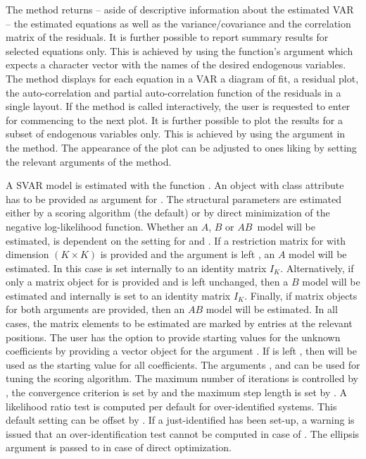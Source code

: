 \documentclass[nojss]{jss}
\begin{document}
The  method returns -- aside of descriptive information about
the estimated VAR -- the estimated equations as well as the
variance/covariance and the correlation matrix of the residuals. It is
further possible to report summary results for selected equations
only. This is achieved by using the function's argument 
which expects a character vector with the names of the desired
endogenous variables. The  method displays for each
equation in a VAR a diagram of fit, a residual plot, the auto-correlation and
partial auto-correlation function of the residuals in a single layout. If the
 method is called interactively, the user is requested to
enter  for commencing to the next plot. It is further
possible to plot the results for a subset of endogenous variables
only. This is achieved by using the argument  in the
 method. The appearance of the plot can be adjusted to ones
liking by setting the relevant arguments of the  method.

A SVAR model is estimated with the function . An object
with class attribute  has to be provided as argument for
. The structural parameters are estimated either by a scoring
algorithm (the default) or by direct minimization of the negative
log-likelihood function. Whether an $A$, $B$ or $AB$~model will be
estimated, is dependent on the setting for  and
. If a restriction matrix for  with dimension
$(K \times K)$ is provided and the argument  is left
, an $A$ model will be estimated. In this case 
is set internally to an identity matrix $I_K$. Alternatively, if only
a matrix object for  is provided and  is left
unchanged, then a $B$ model will be estimated and internally
 is set to an identity matrix $I_K$. Finally, if matrix
objects for both arguments are provided, then an $AB$ model will be
estimated. In all cases, the matrix elements to be estimated are
marked by  entries at the relevant positions. The user has
the option to provide starting values for the unknown coefficients by
providing a vector object for the argument . If
 is left , then  will be used as the
starting value for all coefficients. The arguments ,
 and  can be used for tuning the scoring
algorithm. The maximum number of iterations is controlled by
, the convergence criterion is set by 
and the maximum step length is set by . A likelihood ratio
test is computed per default for over-identified systems. This default
setting can be offset by . If a just-identified
has been set-up, a warning is issued that an over-identification test
cannot be computed in case of . The
ellipsis argument \code{(\ldots)} is passed to  in case of direct
optimization.
    
\end{document}
